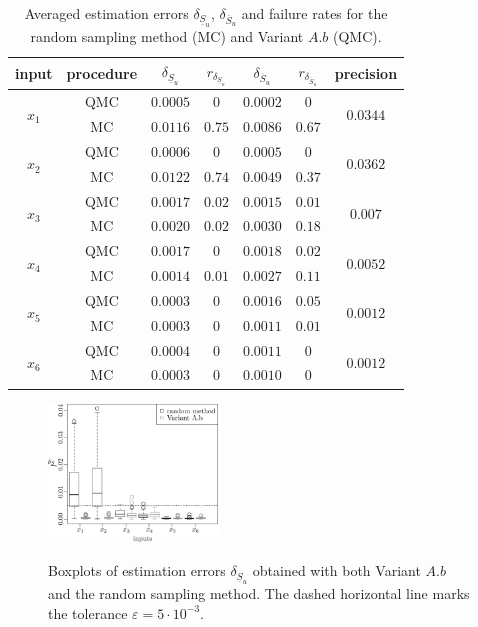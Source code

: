 {\begin{table}[!ht]
\caption{Averaged estimation errors $\delta_{\underline{S}_u}$, $\delta_{\overline{S}_u}$ and failure rates for the random sampling method (MC) and Variant $A.b$ (QMC).}
\centering
\begin{tabular}{ccccccc}
\hline
 input & procedure & $\delta_{\underline{S}_u}$ & $r_{\delta_{\underline{S}_u}}$ & $\delta_{\overline{S}_u}$ &$r_{\delta_{\overline{S}_u}}$ & precision \\
\hline
\multirow{2}{*}{$x_1$} & QMC & $0.0005$ & $0$ & $0.0002$ & $0$ & \multirow{2}{*}{$0.0344$} \\
& MC & $0.0116$ & $0.75$ & $0.0086$ & $0.67$ & \\
\hline
\multirow{2}{*}{$x_2$} & QMC & $0.0006$ & $0$ & $0.0005$ & $0$ & \multirow{2}{*}{$0.0362$} \\
& MC & $0.0122$ & $0.74$ & $0.0049$ & $0.37$ & \\
\hline
\multirow{2}{*}{$x_3$} & QMC & $0.0017$ & $0.02$ & $0.0015$ & $0.01$ & \multirow{2}{*}{$0.007$} \\
& MC & $0.0020$ & $0.02$ & $0.0030$ & $0.18$ & \\
\hline
\multirow{2}{*}{$x_4$} & QMC & $0.0017$ & $0$ & $0.0018$ & $0.02$ & \multirow{2}{*}{$0.0052$} \\
& MC & $0.0014$ & $0.01$ & $0.0027$ & $0.11$ & \\
\hline
\multirow{2}{*}{$x_5$} & QMC & $0.0003$ & $0$ & $0.0016$ & $0.05$ & \multirow{2}{*}{$0.0012$} \\
& MC & $0.0003$ & $0$ & $0.0011$ & $0.01$ & \\
\hline
\multirow{2}{*}{$x_6$} & QMC & $0.0004$ & $0$ & $0.0011$ & $0$ & \multirow{2}{*}{$0.0012$} \\
& MC & $0.0003$ & $0$ & $0.0010$ & $0$ & \\
\hline
\end{tabular}
\label{compa_MC}
\end{table}

\begin{figure}[!ht]
\caption{Boxplots of estimation errors $\delta_{\underline{S}_u}$ obtained with both Variant $A.b$ and the random sampling method. The dashed horizontal line marks the tolerance $\varepsilon=5\cdot 10^{-3}$.}
\centering
\vspace*{0.2cm}
\includegraphics[width=0.4\textwidth]{comp_mc_first.eps}
\label{compa_MC_first}
\end{figure}

}
